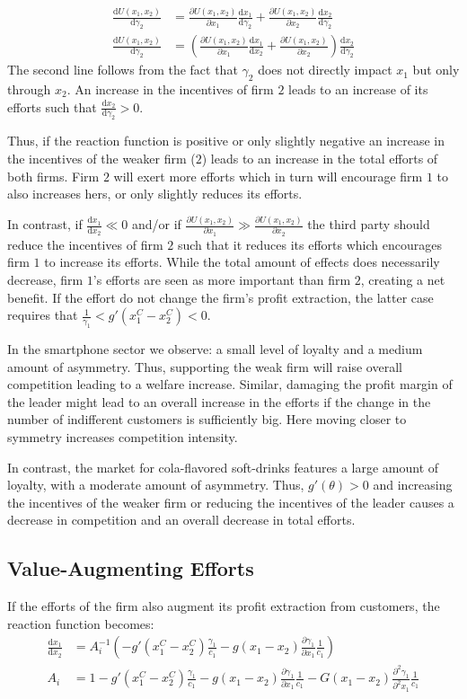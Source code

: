 \documentclass[a4paper, 11pt]{article}
\renewcommand{\d}{\text{d}}
\begin{document}
\begin{align}
\frac{\d U(x_1,x_2)}{\d \gamma_2} &= \frac{\partial U(x_1,x_2)}{\partial x_1}\frac{\d x_1}{\d \gamma_2} + \frac{\partial U(x_1,x_2)}{\partial x_2}\frac{\d x_2}{\d \gamma_2}\\
\frac{\d U(x_1,x_2)}{\d \gamma_2} &= \left(\frac{\partial U(x_1,x_2)}{\partial x_1}\frac{\d x_1}{\d x_2}+ \frac{\partial U(x_1,x_2)}{\partial x_2}\right)\frac{\d x_2}{\d \gamma_2}
\end{align}
The second line follows from the fact that $\gamma_2$ does not directly impact $x_1$ but only through $x_2$. An increase in the incentives of firm $2$ leads to an increase of its efforts such that $\frac{\d x_2}{\d \gamma_2}>0$. 

Thus, if the reaction function is positive or only slightly negative an increase in the incentives of the weaker firm ($2$) leads to an increase in the total efforts of both firms. Firm $2$ will exert more efforts which in turn will encourage firm $1$ to also increases hers, or only slightly reduces its efforts. 

In contrast, if $\frac{\d x_1}{\d x_2}\ll0$ and/or if $\frac{\partial U(x_1,x_2)}{\partial x_1}\gg \frac{\partial U(x_1,x_2)}{\partial x_2}$ the third party should reduce the incentives of firm $2$ such that it reduces its efforts which encourages firm $1$ to increase its efforts. While the total amount of effects does necessarily decrease, firm $1$'s efforts are seen as more important than firm $2$, creating a net benefit. If the effort do not change the firm's profit extraction, the latter case requires that $\frac{1}{\gamma_1}<g'(x_1^C-x_2^C)<0$.

In the smartphone sector we observe: a small level of loyalty and a medium amount of asymmetry. Thus, supporting the weak firm will raise overall competition leading to a welfare increase. Similar, damaging the profit margin of the leader might lead to an overall increase in the efforts if the change in the number of indifferent customers is sufficiently big. Here moving closer to symmetry increases competition intensity.

In contrast, the market for cola-flavored soft-drinks features a large amount of loyalty, with a moderate amount of asymmetry. Thus, $g'(\theta)>0$ and increasing the incentives of the weaker firm or reducing the incentives of the leader causes a decrease in competition and an overall decrease in total efforts.

\subsection{Value-Augmenting Efforts}
If the efforts of the firm also augment its profit extraction from customers, the reaction function becomes:
\begin{align}
\frac{\d x_1}{\d x_2} &= A_i^{-1} \left(-g'(x_1^C-x_2^C)\frac{\gamma_1}{c_1} - g(x_1-x_2)\frac{\partial \gamma_1}{\partial x_1}\frac{1}{c_1}\right)\\
A_i &= 1 - g'(x_1^C-x_2^C)\frac{\gamma_1}{c_1}-g(x_1-x_2)\frac{\partial \gamma_1}{\partial x_1}\frac{1}{c_1}-G(x_1-x_2)\frac{\partial^2 \gamma_1}{\partial^2 x_1}\frac{1}{c_1}
\end{align}
\end{document}
